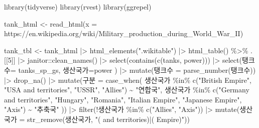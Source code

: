 \documentclass[
  letterpaper,
  chapter,a4paper,showtrims,openright,hidelinks]{oblivoir}
\newenvironment{Shaded}{\begin{snugshade}}{\end{snugshade}}
\newcommand{\AttributeTok}[1]{\textcolor[rgb]{0.40,0.45,0.13}{#1}}
\newcommand{\DecValTok}[1]{\textcolor[rgb]{0.68,0.00,0.00}{#1}}
\newcommand{\FunctionTok}[1]{\textcolor[rgb]{0.28,0.35,0.67}{#1}}
\newcommand{\NormalTok}[1]{\textcolor[rgb]{0.00,0.23,0.31}{#1}}
\newcommand{\OtherTok}[1]{\textcolor[rgb]{0.00,0.23,0.31}{#1}}
\newcommand{\SpecialCharTok}[1]{\textcolor[rgb]{0.37,0.37,0.37}{#1}}
\newcommand{\StringTok}[1]{\textcolor[rgb]{0.13,0.47,0.30}{#1}}
\begin{document}
\begin{Shaded}
\begin{Highlighting}[]
\FunctionTok{library}\NormalTok{(tidyverse)}
\FunctionTok{library}\NormalTok{(rvest)}
\FunctionTok{library}\NormalTok{(ggrepel)}

\NormalTok{tank\_html }\OtherTok{\textless{}{-}} \FunctionTok{read\_html}\NormalTok{(}\AttributeTok{x =} \StringTok{\textquotesingle{}https://en.wikipedia.org/wiki/Military\_production\_during\_World\_War\_II\textquotesingle{}}\NormalTok{)}

\NormalTok{tank\_tbl }\OtherTok{\textless{}{-}}\NormalTok{ tank\_html }\SpecialCharTok{|\textgreater{}} 
  \FunctionTok{html\_elements}\NormalTok{(}\StringTok{".wikitable"}\NormalTok{) }\SpecialCharTok{|\textgreater{}} 
  \FunctionTok{html\_table}\NormalTok{() }\SpecialCharTok{\%\textgreater{}\%}
\NormalTok{  .[[}\DecValTok{5}\NormalTok{]] }\SpecialCharTok{|\textgreater{}} 
\NormalTok{  janitor}\SpecialCharTok{::}\FunctionTok{clean\_names}\NormalTok{() }\SpecialCharTok{|\textgreater{}} 
  \FunctionTok{select}\NormalTok{(}\FunctionTok{contains}\NormalTok{(}\FunctionTok{c}\NormalTok{(}\StringTok{\textquotesingle{}tanks\textquotesingle{}}\NormalTok{, }\StringTok{\textquotesingle{}power\textquotesingle{}}\NormalTok{))) }\SpecialCharTok{|\textgreater{}} 
  \FunctionTok{select}\NormalTok{(탱크수}\OtherTok{=}\NormalTok{ tanks\_sp\_gs, 생산국가}\OtherTok{=}\NormalTok{power ) }\SpecialCharTok{|\textgreater{}} 
  \FunctionTok{mutate}\NormalTok{(탱크수 }\OtherTok{=} \FunctionTok{parse\_number}\NormalTok{(탱크수)) }\SpecialCharTok{|\textgreater{}} 
  \FunctionTok{drop\_na}\NormalTok{()  }\SpecialCharTok{|\textgreater{}} 
  \FunctionTok{mutate}\NormalTok{(구분 }\OtherTok{=} \FunctionTok{case\_when}\NormalTok{(}
\NormalTok{    생산국가 }\SpecialCharTok{\%in\%} \FunctionTok{c}\NormalTok{(}\StringTok{"British Empire"}\NormalTok{, }\StringTok{"USA and territories"}\NormalTok{, }\StringTok{"USSR"}\NormalTok{, }\StringTok{"Allies"}\NormalTok{) }\SpecialCharTok{\textasciitilde{}} \StringTok{"연합국"}\NormalTok{,}
\NormalTok{    생산국가 }\SpecialCharTok{\%in\%} \FunctionTok{c}\NormalTok{(}\StringTok{"Germany and territories"}\NormalTok{, }\StringTok{"Hungary"}\NormalTok{, }\StringTok{"Romania"}\NormalTok{, }\StringTok{"Italian Empire"}\NormalTok{, }
\StringTok{"Japanese Empire"}\NormalTok{, }\StringTok{"Axis"}\NormalTok{) }\SpecialCharTok{\textasciitilde{}} \StringTok{"추축국"}
\NormalTok{  )) }\SpecialCharTok{|\textgreater{}} 
  \FunctionTok{filter}\NormalTok{(}\SpecialCharTok{!}\NormalTok{생산국가 }\SpecialCharTok{\%in\%} \FunctionTok{c}\NormalTok{(}\StringTok{"Allies"}\NormalTok{, }\StringTok{"Axis"}\NormalTok{)) }\SpecialCharTok{|\textgreater{}} 
  \FunctionTok{mutate}\NormalTok{(생산국가 }\OtherTok{=} \FunctionTok{str\_remove}\NormalTok{(생산국가, }\StringTok{"( and territories)|( Empire)"}\NormalTok{))}


\end{Highlighting}
\end{Shaded}
\end{document}
